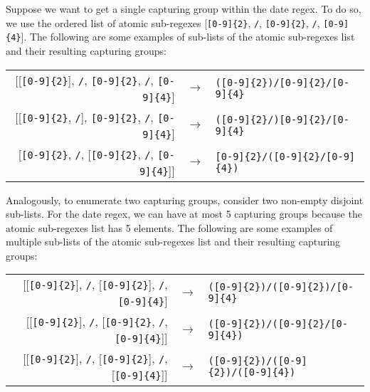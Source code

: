 \begin{example}
Suppose we want to get a single capturing group within the date regex.%
To do so, we use the ordered list of atomic sub-regexes [\verb![0-9]{2}!, \verb!/!, \verb![0-9]{2}!, \verb!/!, \verb![0-9]{4}!].
The following are some examples of sub-lists of the atomic sub-regexes list and their resulting capturing groups:

\begin{center}
\setlength{\extrarowheight}{10pt}
\begin{tabular}{rcl}
[[\verb![0-9]{2}!], \verb!/!, \verb![0-9]{2}!, \verb!/!, \verb![0-9]{4}!] & $\rightarrow$ & \verb!([0-9]{2})/[0-9]{2}/[0-9]{4}! \\

[[\verb![0-9]{2}!, \verb!/!], \verb![0-9]{2}!, \verb!/!, \verb![0-9]{4}!] & $\rightarrow$ & \verb!([0-9]{2}/)[0-9]{2}/[0-9]{4}! \\

[\verb![0-9]{2}!, \verb!/!, [\verb![0-9]{2}!, \verb!/!, \verb![0-9]{4}!]] & $\rightarrow$ & \verb![0-9]{2}/([0-9]{2}/[0-9]{4})!
\end{tabular}\bigskip
\end{center}

\noindent
Analogously, to enumerate two capturing groups, consider two non-empty disjoint sub-lists. For the date regex, we can have at most 5 capturing groups because the atomic sub-regexes list has 5 elements. The following are some examples of multiple sub-lists of the atomic sub-regexes list and their resulting capturing groups:

\begin{center}
\setlength{\extrarowheight}{10pt}
\begin{tabular}{rcl}
[[\verb![0-9]{2}!], \verb!/!, [\verb![0-9]{2}!], \verb!/!, \verb![0-9]{4}!] & $\rightarrow$ & \verb!([0-9]{2})/([0-9]{2})/[0-9]{4}! \\

[[\verb![0-9]{2}!], \verb!/!, [\verb![0-9]{2}!, \verb!/!, \verb![0-9]{4}!]] & $\rightarrow$ & \verb!([0-9]{2})/([0-9]{2}/[0-9]{4})! \\

[[\verb![0-9]{2}!], \verb!/!, [\verb![0-9]{2}!], \verb!/!, [\verb![0-9]{4}!]] & $\rightarrow$ & \verb!([0-9]{2})/([0-9]{2})/([0-9]{4})!
\end{tabular}\bigskip
\end{center}
\end{example}

